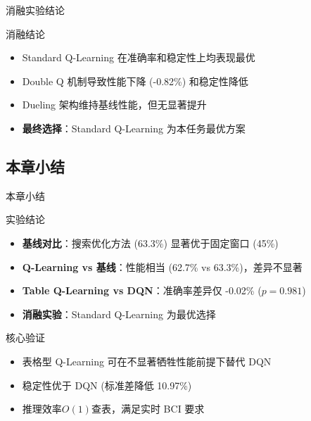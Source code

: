 {\begin{frame}{消融实验结论}
    \begin{block}{消融结论}
        \footnotesize
        \begin{itemize}
            \item Standard Q-Learning 在准确率和稳定性上均表现最优
            \item Double Q 机制导致性能下降 (-0.82\%) 和稳定性降低
            \item Dueling 架构维持基线性能，但无显著提升
            \item \textbf{最终选择}：Standard Q-Learning 为本任务最优方案
        \end{itemize}
    \end{block}
\end{frame}

\subsection{本章小结}

\begin{frame}{本章小结}
    \begin{block}{实验结论}
        \footnotesize
        \begin{itemize}
            \item \textbf{基线对比}：搜索优化方法 (63.3\%) 显著优于固定窗口 (45\%)
            \item \textbf{Q-Learning vs 基线}：性能相当 (62.7\% vs 63.3\%)，差异不显著
            \item \textbf{Table Q-Learning vs DQN}：准确率差异仅 -0.02\% ($p=0.981$)
            \item \textbf{消融实验}：Standard Q-Learning 为最优选择
        \end{itemize}
    \end{block}

    \vspace{0.2cm}
    \begin{block}{核心验证}
        \footnotesize
        \begin{itemize}
            \item 表格型 Q-Learning 可在不显著牺牲性能前提下替代 DQN
            \item 稳定性优于 DQN (标准差降低 10.97\%)
            \item 推理效率$O(1)$查表，满足实时 BCI 要求
        \end{itemize}
    \end{block}
\end{frame}

} %
